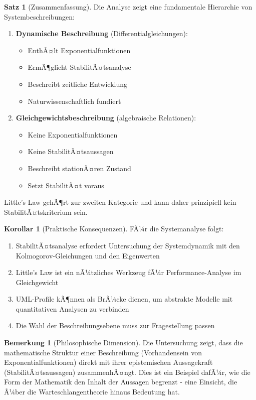 ﻿\documentclass[a4paper,12pt]{scrreprt}
\theoremstyle{definition}
\newtheorem{bemerkung}{Bemerkung}[section]
\newtheorem{satz}{Satz}[section]
\newtheorem{korollar}{Korollar}[section]
\begin{document}
\begin{satz}[Zusammenfassung]
	Die Analyse zeigt eine fundamentale Hierarchie von Systembeschreibungen:
	\begin{enumerate}
		\item[-] \textbf{Dynamische Beschreibung} (Differentialgleichungen):
		\begin{itemize}
			\item[-] EnthÃ¤lt Exponentialfunktionen
			\item[-] ErmÃ¶glicht StabilitÃ¤tsanalyse
			\item[-] Beschreibt zeitliche Entwicklung
			\item[-] Naturwissenschaftlich fundiert
		\end{itemize}
		
		\item[-] \textbf{Gleichgewichtsbeschreibung} (algebraische Relationen):
		\begin{itemize}
			\item[-] Keine Exponentialfunktionen
			\item[-] Keine StabilitÃ¤tsaussagen
			\item[-] Beschreibt stationÃ¤ren Zustand
			\item[-] Setzt StabilitÃ¤t voraus
		\end{itemize}
	\end{enumerate}
	
	Little's Law gehÃ¶rt zur zweiten Kategorie und kann daher prinzipiell kein StabilitÃ¤tskriterium sein.
\end{satz}

\begin{korollar}[Praktische Konsequenzen]
	FÃ¼r die Systemanalyse folgt:
	\begin{enumerate}
		\item[-] StabilitÃ¤tsanalyse erfordert Untersuchung der Systemdynamik mit den Kolmogorov-Gleichun\-gen und den Eigenwerten
		\item[-] Little's Law ist ein nÃ¼tzliches Werkzeug fÃ¼r Performance-Analyse im Gleichgewicht
		\item[-] UML-Profile kÃ¶nnen als BrÃ¼cke dienen, um abstrakte Modelle mit quantitativen Analysen zu verbinden
		\item[-] Die Wahl der Beschreibungsebene muss zur Fragestellung passen
	\end{enumerate}
\end{korollar}

\begin{bemerkung}[Philosophische Dimension]
	Die Untersuchung zeigt, dass die mathematische Struktur einer Beschreibung (Vorhandensein von Exponentialfunktionen) direkt mit ihrer epistemischen Aussagekraft (StabilitÃ¤tsaussagen) zusammenhÃ¤ngt. Dies ist ein Beispiel dafÃ¼r, wie die Form der Mathematik den Inhalt der Aussagen begrenzt - eine Einsicht, die Ã¼ber die Warteschlangentheorie hinaus Bedeutung hat.
\end{bemerkung}
\end{document}
